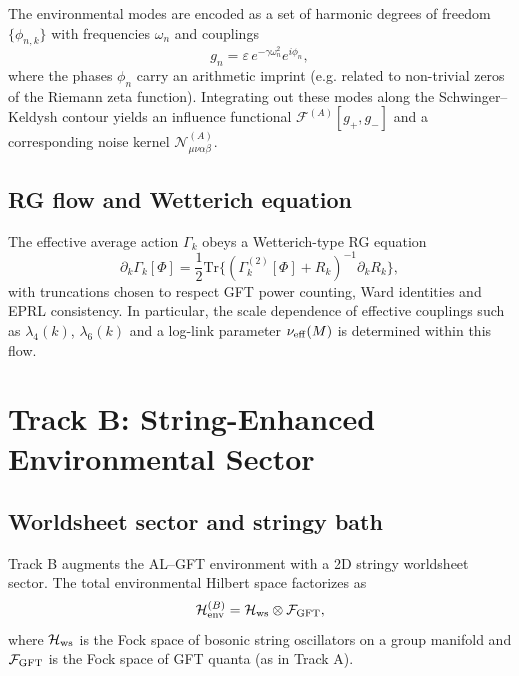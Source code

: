 \documentclass[11pt]{article}
\begin{document}
The environmental modes are encoded as a set of harmonic degrees of freedom $\{\phi_{n,k}\}$ with frequencies $\omega_n$ and couplings
\begin{equation}
  g_n = \varepsilon \, e^{-\gamma \omega_n^2} e^{i\phi_n},
\end{equation}
where the phases $\phi_n$ carry an arithmetic imprint (e.g. related to non-trivial zeros of the Riemann zeta function). Integrating out these modes along the Schwinger--Keldysh contour yields an influence functional $\mathcal{F}^{(A)}[g_{+},g_{-}]$ and a corresponding noise kernel $\mathcal{N}^{(A)}_{\mu\nu\alpha\beta}$.

\subsection{RG flow and Wetterich equation}

The effective average action $\Gamma_k$ obeys a Wetterich-type RG equation
\begin{equation}
  \partial_k \Gamma_k[\Phi]
  = \frac{1}{2} \mathrm{Tr}
    \Big\{
      (\Gamma_k^{(2)}[\Phi] + R_k)^{-1} \partial_k R_k
    \Big\},
\end{equation}
with truncations chosen to respect GFT power counting, Ward identities and EPRL consistency. In particular, the scale dependence of effective couplings such as $\lambda_4(k)$, $\lambda_6(k)$ and a log-link parameter $\nu_{\rm eff}(M)$ is determined within this flow.

\section{Track B: String-Enhanced Environmental Sector}

\subsection{Worldsheet sector and stringy bath}

Track B augments the AL--GFT environment with a 2D stringy worldsheet sector. The total environmental Hilbert space factorizes as
\begin{equation}
  \mathcal{H}_{\rm env}^{(B)} = \mathcal{H}_{\rm ws} \otimes \mathcal{F}_{\rm GFT},
\end{equation}
where $\mathcal{H}_{\rm ws}$ is the Fock space of bosonic string oscillators on a group manifold and $\mathcal{F}_{\rm GFT}$ is the Fock space of GFT quanta (as in Track A).
\end{document}
